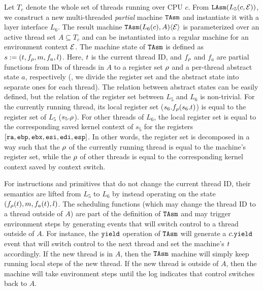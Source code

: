 {Let $T_c$ denote the whole set of threads running over CPU $c$.
From ${\texttt{LAsm}}(L_5(c,\mathcal{E}))$, we construct a new 
multi-threaded \emph{partial} machine ${\texttt{TAsm}}$
and instantiate it with a layer interface $L_6$.
The result machine 
${\texttt{TAsm}}(L_6(c), A)\langle \mathcal{E} \rangle$ is 
parameterized over an active thread set $A \subseteq T_c$
and can be instantiated into a regular machine for
an environment context $\mathcal{E}$.
The machine state of ${\texttt{TAsm}}$ is defined as $s:=(t, f_\rho, m, f_a, l)$.
Here, $t$ is the current thread ID, and
$f_\rho$ and $f_a$ are partial functions
from IDs of threads in $A$ to a register set $\rho$
and a per-thread abstract state $a$, respectively (\ie,
we divide the register set and the abstract state
into separate ones for each thread).
The relation between abstract states
can be easily defined, but the relation of the register set between $L_5$ and $L_6$ is non-trivial.
For the currently running thread, its local register set ($s_6.f_\rho(s_6.t)$) is equal
to the register set of $L_5$ ($s_5.\rho$).
For other threads of $L_6$, the local register set is equal
to the corresponding saved kernel context of $s_5$ for the registers
$[{\texttt{ra}}, {\texttt{ebp}}, {\texttt{ebx}}, {\texttt{esi}}, {\texttt{edi}}, {\texttt{esp}}]$.
In other words, the register set is decomposed in a way such that the $\rho$ of the
currently running thread is equal to the machine's register set, while the $\rho$ of
other threads is equal to the corresponding kernel context saved by context switch.


For instructions and primitives that do not change the current thread
ID, their semantics are lifted from $L_5$ to $L_6$
by instead operating on the state $(f_\rho(t), m, f_a(t), l)$.
The scheduling functions (which may change the thread ID to a thread outside of $A$)
are part of the definition of ${\texttt{TAsm}}$
and may trigger environment steps by generating events
that will switch control to a thread outside of $A$.
For instance,
the ${\texttt{yield}}$ operation of ${\texttt{TAsm}}$
will generate a $c.{\texttt{yield}}$ event that will switch control to the next thread
and set the machine's $t$ accordingly.
If the new thread is in $A$,
then the ${\texttt{TAsm}}$ machine will simply keep running local steps of the new thread.
If the new thread is outside of $A$,
then the machine will take environment steps
until the log indicates that control switches back to  $A$.

}
